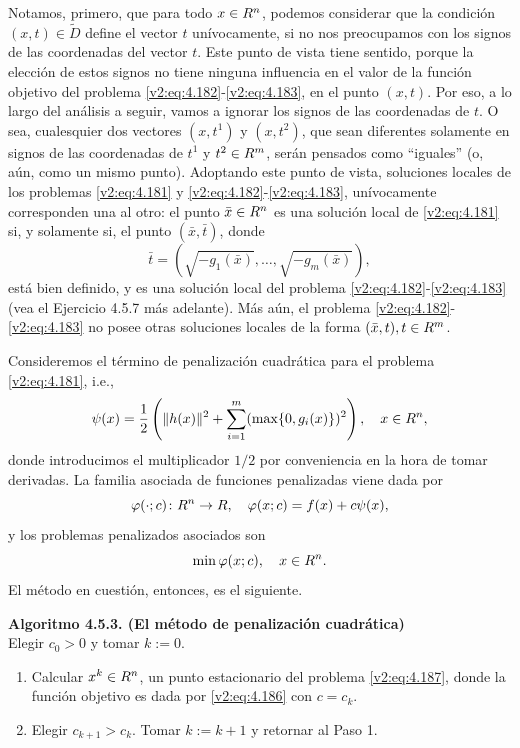 Notamos, primero, que para todo $x \in R^n$, podemos considerar que la condición $(x, t) \in \tilde{D}$ define el vector $t$ unívocamente, si no nos preocupamos con los signos de las coordenadas del vector $t$. Este punto de vista tiene sentido, porque la elección de estos signos no tiene ninguna influencia en el valor de la función objetivo del problema \eqref{v2:eq:4.182}-\eqref{v2:eq:4.183}, en el punto $(x, t)$. Por eso, a lo largo del análisis a seguir, vamos a ignorar los signos de las coordenadas de $t$. O sea, cualesquier dos vectores $(x, t^1)$ y $(x, t^2)$, que sean diferentes solamente en signos de las coordenadas de $t^1$ y $t^2 \in R^m$, serán pensados como ``iguales'' (o, aún, como un mismo punto). Adoptando este punto de vista, soluciones locales de los problemas \eqref{v2:eq:4.181} y \eqref{v2:eq:4.182}-\eqref{v2:eq:4.183}, unívocamente corresponden una al otro: el punto $\bar{x} \in R^n$ es una solución local de \eqref{v2:eq:4.181} si, y solamente si, el punto $(\bar{x}, \bar{t})$, donde
\begin{equation}
    \bar{t} = (\sqrt{-g_1(\bar{x})}, \dots, \sqrt{-g_m(\bar{x})}),
    \label{v2:eq:4.184}
\end{equation}
está bien definido, y es una solución local del problema \eqref{v2:eq:4.182}-\eqref{v2:eq:4.183} (vea el Ejercicio 4.5.7 más adelante). Más aún, el problema \eqref{v2:eq:4.182}-\eqref{v2:eq:4.183} no posee otras soluciones locales de la forma $(\bar{x}, t), t \in R^m$.

Consideremos el término de penalización cuadrática para el problema \eqref{v2:eq:4.181}, i.e.,
\begin{equation}
    \psi(x) = \frac{1}{2} \left( \|h(x)\|^2 + \sum_{i=1}^m (\max\{0, g_i(x)\})^2 \right), \quad x \in R^n,
    \label{v2:eq:4.185}
\end{equation}
donde introducimos el multiplicador $1/2$ por conveniencia en la hora de tomar derivadas. La familia asociada de funciones penalizadas viene dada por
\begin{equation}
    \varphi(\cdot; c) \colon R^n \to R, \quad \varphi(x; c) = f(x) + c\psi(x),
    \label{v2:eq:4.186}
\end{equation}
y los problemas penalizados asociados son
\begin{equation}
    \min \varphi(x; c), \quad x \in R^n.
    \label{v2:eq:4.187}
\end{equation}
El método en cuestión, entonces, es el siguiente.

\noindent \textbf{Algoritmo 4.5.3. (El método de penalización cuadrática)} \\
Elegir $c_0 > 0$ y tomar $k := 0$.
\begin{enumerate}
    \item Calcular $x^k \in R^n$, un punto estacionario del problema \eqref{v2:eq:4.187}, donde la función objetivo es dada por \eqref{v2:eq:4.186} con $c = c_k$.
    \item Elegir $c_{k+1} > c_k$. Tomar $k := k + 1$ y retornar al Paso 1.
\end{enumerate}


